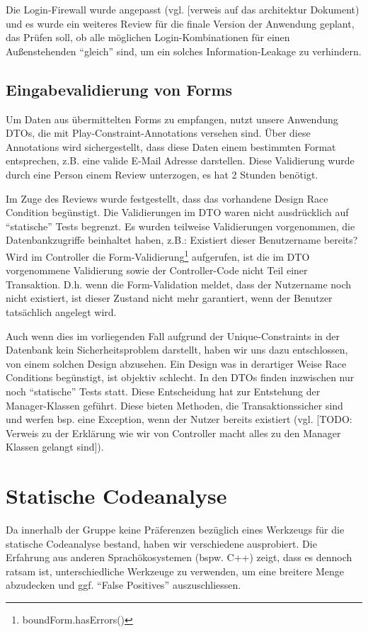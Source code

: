 \documentclass[12pt,DIV14,BCOR10mm,a4paper,twoside,parskip=half-,headsepline,headinclude,english,ngerman,bibliography=totocnumbered]{scrreprt}
\begin{document}
Die Login-Firewall wurde angepasst (vgl. [verweis auf das architektur Dokument) und es wurde ein weiteres Review für die finale Version der Anwendung geplant, das Prüfen soll, ob alle möglichen Login-Kombinationen für einen Außenstehenden ``gleich'' sind, um ein solches Information-Leakage zu verhindern.

\subsection{Eingabevalidierung von Forms}
Um Daten aus übermittelten Forms zu empfangen, nutzt unsere Anwendung DTOs, die mit Play-Constraint-Annotations versehen sind. Über diese Annotations wird sichergestellt, dass diese Daten einem bestimmten Format entsprechen, z.B. eine valide E-Mail Adresse darstellen. Diese Validierung wurde durch eine Person einem Review unterzogen, es hat 2 Stunden benötigt.

Im Zuge des Reviews wurde festgestellt, dass das vorhandene Design Race Condition begünstigt. Die Validierungen im DTO waren nicht ausdrücklich auf ``statische'' Tests begrenzt. Es wurden teilweise Validierungen vorgenommen, die Datenbankzugriffe beinhaltet haben, z.B.: Existiert dieser Benutzername bereits? Wird im Controller die Form-Validierung\footnote{boundForm.hasErrors()} aufgerufen, ist die im DTO vorgenommene Validierung sowie der Controller-Code nicht Teil einer Transaktion. D.h. wenn die Form-Validation meldet, dass der Nutzername noch nicht existiert, ist dieser Zustand nicht mehr garantiert, wenn der Benutzer tatsächlich angelegt wird.

Auch wenn dies im vorliegenden Fall aufgrund der Unique-Constraints in der Datenbank kein Sicherheitsproblem darstellt, haben wir uns dazu entschlossen, von einem solchen Design abzusehen. Ein Design was in derartiger Weise Race Conditions begünstigt, ist objektiv schlecht. In den DTOs finden inzwischen nur noch ``statische'' Tests statt. Diese Entscheidung hat zur Entstehung der Manager-Klassen geführt. Diese bieten Methoden, die Transaktionssicher sind und werfen bsp. eine Exception, wenn der Nutzer bereits existiert (vgl. [TODO: Verweis zu der Erklärung wie wir von Controller macht alles zu den Manager Klassen gelangt sind]).

\section{Statische Codeanalyse}

Da innerhalb der Gruppe keine Präferenzen bezüglich eines Werkzeugs für die statische Codeanalyse bestand, haben wir verschiedene ausprobiert.
Die Erfahrung aus anderen Sprachökosystemen (bspw. C++) zeigt, dass es dennoch ratsam ist, unterschiedliche Werkzeuge zu verwenden, um eine breitere Menge abzudecken und ggf. \enquote{False Positives} auszuschliessen.
\end{document}
